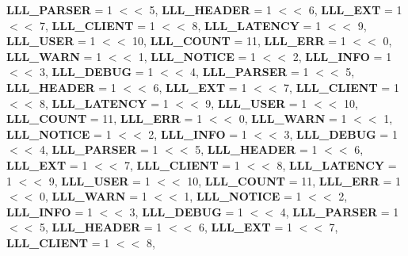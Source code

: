 \begin{DoxyCompactItemize}
\newline
{\bfseries L\+L\+L\+\_\+\+P\+A\+R\+S\+ER} = 1 $<$$<$ 5, 
{\bfseries L\+L\+L\+\_\+\+H\+E\+A\+D\+ER} = 1 $<$$<$ 6, 
{\bfseries L\+L\+L\+\_\+\+E\+XT} = 1 $<$$<$ 7, 
{\bfseries L\+L\+L\+\_\+\+C\+L\+I\+E\+NT} = 1 $<$$<$ 8, 
\newline
{\bfseries L\+L\+L\+\_\+\+L\+A\+T\+E\+N\+CY} = 1 $<$$<$ 9, 
{\bfseries L\+L\+L\+\_\+\+U\+S\+ER} = 1 $<$$<$ 10, 
{\bfseries L\+L\+L\+\_\+\+C\+O\+U\+NT} = 11, 
{\bfseries L\+L\+L\+\_\+\+E\+RR} = 1 $<$$<$ 0, 
\newline
{\bfseries L\+L\+L\+\_\+\+W\+A\+RN} = 1 $<$$<$ 1, 
{\bfseries L\+L\+L\+\_\+\+N\+O\+T\+I\+CE} = 1 $<$$<$ 2, 
{\bfseries L\+L\+L\+\_\+\+I\+N\+FO} = 1 $<$$<$ 3, 
{\bfseries L\+L\+L\+\_\+\+D\+E\+B\+UG} = 1 $<$$<$ 4, 
\newline
{\bfseries L\+L\+L\+\_\+\+P\+A\+R\+S\+ER} = 1 $<$$<$ 5, 
{\bfseries L\+L\+L\+\_\+\+H\+E\+A\+D\+ER} = 1 $<$$<$ 6, 
{\bfseries L\+L\+L\+\_\+\+E\+XT} = 1 $<$$<$ 7, 
{\bfseries L\+L\+L\+\_\+\+C\+L\+I\+E\+NT} = 1 $<$$<$ 8, 
\newline
{\bfseries L\+L\+L\+\_\+\+L\+A\+T\+E\+N\+CY} = 1 $<$$<$ 9, 
{\bfseries L\+L\+L\+\_\+\+U\+S\+ER} = 1 $<$$<$ 10, 
{\bfseries L\+L\+L\+\_\+\+C\+O\+U\+NT} = 11, 
{\bfseries L\+L\+L\+\_\+\+E\+RR} = 1 $<$$<$ 0, 
\newline
{\bfseries L\+L\+L\+\_\+\+W\+A\+RN} = 1 $<$$<$ 1, 
{\bfseries L\+L\+L\+\_\+\+N\+O\+T\+I\+CE} = 1 $<$$<$ 2, 
{\bfseries L\+L\+L\+\_\+\+I\+N\+FO} = 1 $<$$<$ 3, 
{\bfseries L\+L\+L\+\_\+\+D\+E\+B\+UG} = 1 $<$$<$ 4, 
\newline
{\bfseries L\+L\+L\+\_\+\+P\+A\+R\+S\+ER} = 1 $<$$<$ 5, 
{\bfseries L\+L\+L\+\_\+\+H\+E\+A\+D\+ER} = 1 $<$$<$ 6, 
{\bfseries L\+L\+L\+\_\+\+E\+XT} = 1 $<$$<$ 7, 
{\bfseries L\+L\+L\+\_\+\+C\+L\+I\+E\+NT} = 1 $<$$<$ 8, 
\newline
{\bfseries L\+L\+L\+\_\+\+L\+A\+T\+E\+N\+CY} = 1 $<$$<$ 9, 
{\bfseries L\+L\+L\+\_\+\+U\+S\+ER} = 1 $<$$<$ 10, 
{\bfseries L\+L\+L\+\_\+\+C\+O\+U\+NT} = 11, 
{\bfseries L\+L\+L\+\_\+\+E\+RR} = 1 $<$$<$ 0, 
\newline
{\bfseries L\+L\+L\+\_\+\+W\+A\+RN} = 1 $<$$<$ 1, 
{\bfseries L\+L\+L\+\_\+\+N\+O\+T\+I\+CE} = 1 $<$$<$ 2, 
{\bfseries L\+L\+L\+\_\+\+I\+N\+FO} = 1 $<$$<$ 3, 
{\bfseries L\+L\+L\+\_\+\+D\+E\+B\+UG} = 1 $<$$<$ 4, 
\newline
{\bfseries L\+L\+L\+\_\+\+P\+A\+R\+S\+ER} = 1 $<$$<$ 5, 
{\bfseries L\+L\+L\+\_\+\+H\+E\+A\+D\+ER} = 1 $<$$<$ 6, 
{\bfseries L\+L\+L\+\_\+\+E\+XT} = 1 $<$$<$ 7, 
{\bfseries L\+L\+L\+\_\+\+C\+L\+I\+E\+NT} = 1 $<$$<$ 8, 
$$
\end{DoxyCompactItemize}

